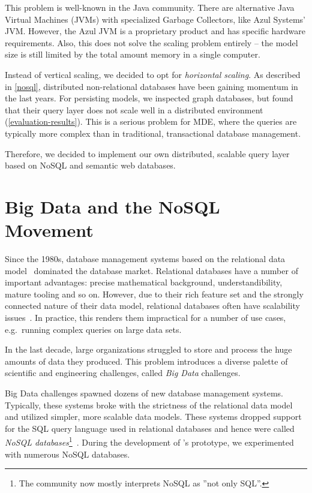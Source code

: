 This problem is well-known in the Java community. There are alternative Java Virtual Machines (JVMs) with specialized Garbage Collectors, like Azul Systems' JVM. However, the Azul JVM is a proprietary product and has specific hardware requirements. Also, this does not solve the scaling problem entirely -- the model size is still limited by the total amount memory in a single computer.

Instead of vertical scaling, we decided to opt for \emph{horizontal scaling}. As described in \autoref{nosql}, distributed non-relational databases have been gaining momentum in the last years. For persisting models, we inspected graph databases, but found that their query layer does not scale well in a distributed environment (\autoref{evaluation-results}). This is a serious problem for MDE, where the queries are typically more complex than in traditional, transactional database management.

Therefore, we decided to implement our own distributed, scalable query layer based on NoSQL and semantic web databases.


\section{Big Data and the NoSQL Movement}
\label{nosql}

Since the 1980s, database management systems based on the relational data model~\cite{Codd:1970:RMD:362384.362685} dominated the database market. Relational databases have a number of important advantages: precise mathematical background, understandibility, mature tooling and so on. However, due to their rich feature set and the strongly connected nature of their data model, relational databases often have scalability issues~\cite{Jacobs:2009:PBD:1536616.1536632, Sakr13}. In practice, this renders them impractical for a number of use cases, e.g.\ running complex queries on large data sets.

In the last decade, large organizations struggled to store and process the huge amounts of data they produced. This problem introduces a diverse palette of scientific and engineering challenges, called \emph{Big Data} challenges. 

Big Data challenges spawned dozens of new database management systems. Typically, these systems broke with the strictness of the relational data model and utilized simpler, more scalable data models. These systems dropped support for the SQL query language used in relational databases and hence were called \emph{NoSQL databases}\footnote{The community now mostly interprets NoSQL as ''not only SQL''.}~\cite{NoSQL}. During the development of \iqd{}'s prototype, we experimented with numerous NoSQL databases.

